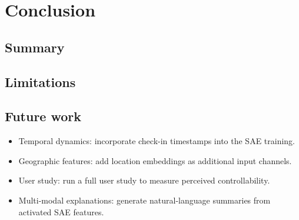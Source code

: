 \chapter{Conclusion}
\label{chap:conclusion}


\section{Summary}


\section{Limitations}


\section{Future work}

\begin{itemize}
  \item Temporal dynamics: incorporate check-in timestamps into the SAE training.
  \item Geographic features: add location embeddings as additional input channels.
  \item User study: run a full user study to measure perceived controllability.
  \item Multi-modal explanations: generate natural-language summaries from
        activated SAE features.
\end{itemize}
